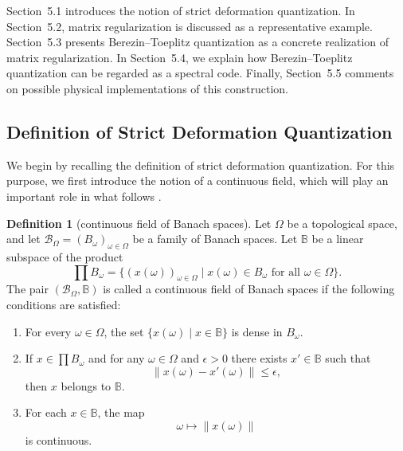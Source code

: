 \documentclass[12pt]{article}
\theoremstyle{definition} %
\newtheorem{definition}{Definition}
\theoremstyle{plain} %
\theoremstyle{remark} %
\theoremstyle{underline}
\begin{document}
Section~5.1 introduces the notion of strict deformation quantization. In Section~5.2, matrix regularization is discussed as a representative example. Section~5.3 presents Berezin--Toeplitz quantization as a concrete realization of matrix regularization.
In Section~5.4, we explain how Berezin--Toeplitz quantization can be regarded as a spectral code. Finally, Section~5.5 comments on possible physical implementations of this construction.


\subsection{Definition of Strict Deformation Quantization}

We begin by recalling the definition of strict deformation quantization.
For this purpose, we first introduce the notion of a continuous field, which will play an important role in what follows \cite{natsume}.

\begin{definition}[continuous field of Banach spaces]
    Let $\Omega$ be a topological space, and let
    $\mathcal{B}_\Omega = (B_{\omega})_{\omega \in \Omega}$ be a family of Banach spaces.
    Let $\mathbb{B}$ be a linear subspace of the product
    \[
        \prod B_{\omega}
        =
        \{ (x(\omega))_{\omega\in\Omega} \mid x(\omega)\in B_{\omega} \text{ for all }
        \omega\in\Omega \}.
    \]
    The pair $(\mathcal{B}_\Omega, \mathbb{B})$ is called a continuous field of Banach spaces if the following conditions are satisfied:
    \begin{enumerate}
        \item For every $\omega\in\Omega$, the set
        $\{x(\omega)\mid x\in\mathbb{B}\}$ is dense in $B_{\omega}$.
        \item If $x\in\prod B_{\omega}$ and for any $\omega\in\Omega$ and
        $\epsilon>0$ there exists $x'\in\mathbb{B}$ such that
        \[
            \|x(\omega)-x'(\omega)\|\le\epsilon,
        \]
        then $x$ belongs to $\mathbb{B}$.
        \item For each $x\in\mathbb{B}$, the map
        \[
            \omega\longmapsto \|x(\omega)\|
        \]
        is continuous.
    \end{enumerate}
\end{definition}
\end{document}
